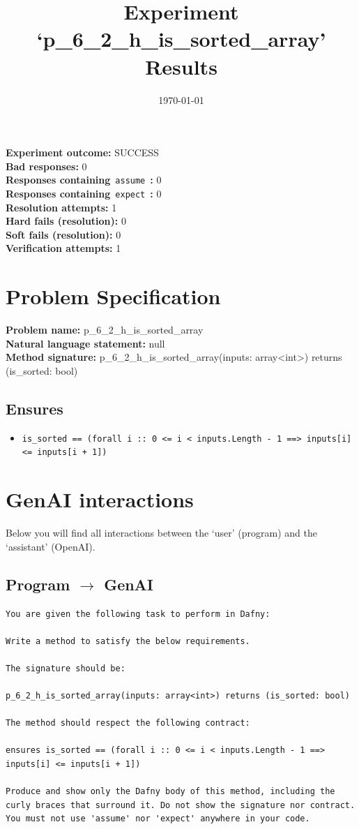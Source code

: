 \documentclass{article}
\begin{document}
\title{Experiment `p\_6\_2\_h\_is\_sorted\_array' Results}
\author{\today}
\date{}
\maketitle
\textbf{Experiment outcome: }SUCCESS
\\\textbf{Bad responses: }0
\\\textbf{Responses containing}~\texttt{assume}~\textbf{: }0
\\\textbf{Responses containing}~\texttt{expect}~\textbf{: }0
\\\textbf{Resolution attempts: }1
\\\textbf{Hard fails (resolution): }0
\\\textbf{Soft fails (resolution): }0
\\\textbf{Verification attempts: }1
\section*{Problem Specification}
\textbf{Problem name: }p\_6\_2\_h\_is\_sorted\_array
\\\textbf{Natural language statement: }null
\\\textbf{Method signature: }p\_6\_2\_h\_is\_sorted\_array(inputs: array<int>) returns (is\_sorted: bool)
\subsection*{Ensures}
\begin{itemize}
\item \texttt{is\_sorted == (forall i :: 0 <= i < inputs.Length - 1 ==> inputs[i] <= inputs[i + 1])}
\end{itemize}
\clearpage
\section*{GenAI interactions}
Below you will find all interactions between the `user' (program) and the `assistant' (OpenAI).
\subsection*{Program $\rightarrow$ GenAI}
\begin{lstlisting}
You are given the following task to perform in Dafny:

Write a method to satisfy the below requirements.

The signature should be:

p_6_2_h_is_sorted_array(inputs: array<int>) returns (is_sorted: bool)

The method should respect the following contract:

ensures is_sorted == (forall i :: 0 <= i < inputs.Length - 1 ==> inputs[i] <= inputs[i + 1])

Produce and show only the Dafny body of this method, including the curly braces that surround it. Do not show the signature nor contract. You must not use 'assume' nor 'expect' anywhere in your code.
\end{lstlisting}
\end{document}
